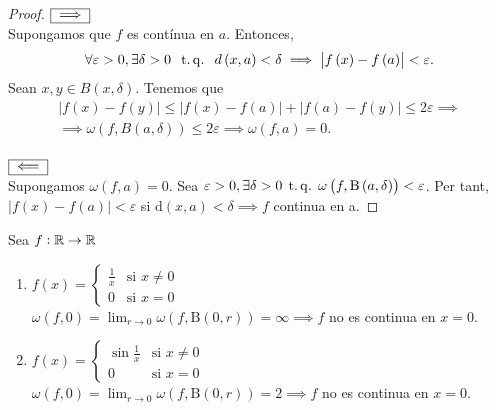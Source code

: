\begin{proof}
    $\boxed{\implies}$ \\
    Supongamos que $f$ es contínua en $a$. Entonces,
    \[
        \forall \varepsilon > 0, \exists \delta > 0 \; \operatorname{\;t.q.\;} \; d\left(x, a \right)
        <\delta \implies \left| f\left(x \right) - f\left( a \right) \right|
        < \varepsilon.
    \]
    Sean $x, y \in B\left( x, \delta \right)$. Tenemos que
    \[
        \begin{gathered}
            \left| f\left(x \right) - f\left( y \right) \right| \leq
            \left| f\left(x \right) - f\left( a \right) \right| +
            \left| f\left(a \right) - f\left( y \right) \right| \leq 2\varepsilon
            \implies \\
            \implies \omega\left( f, B\left( a, \delta \right) \right) \leq
            2\varepsilon \implies \omega \left( f, a \right) =0.
        \end{gathered}
    \] \\
    $\boxed{\impliedby}$ \\
    Supongamos $\omega \left( f, a \right) = 0$. Sea $\varepsilon > 0, \exists \delta > 0 \operatorname{\;t.q.\;} \omega \left( f, \text{B}\left(a, \delta \right) \right) < \varepsilon$. Per tant, $|f(x) - f(a)| < \varepsilon$ si $\text{d}\left( x, a \right) < \delta \implies f$ continua en a.
\end{proof}
\begin{example}
    Sea $f: \mathbb{R} \to \mathbb{R}$
    \begin{enumerate}
        \item $f(x) = \begin{cases}
            \frac{1}{x} & \text{si } x \neq 0 \\
            0 & \text{si } x = 0
            \end{cases}$ \\
            $\omega \left( f, 0 \right) = \lim_{r \to 0} \omega \left( f, \text{B} \left( 0, r \right) \right) = \infty \implies f$ no es continua en $x = 0$.
        \item $f(x) = \begin{cases}
            \sin \frac{1}{x} & \text{si } x \neq 0 \\
            0 & \text{si } x = 0
            \end{cases}$ \\
            $\omega \left( f, 0 \right) = \lim_{r \to 0} \omega \left( f, \text{B} \left( 0, r \right) \right) = 2 \implies f$ no es continua en $x = 0$.
    \end{enumerate}
\end{example}

